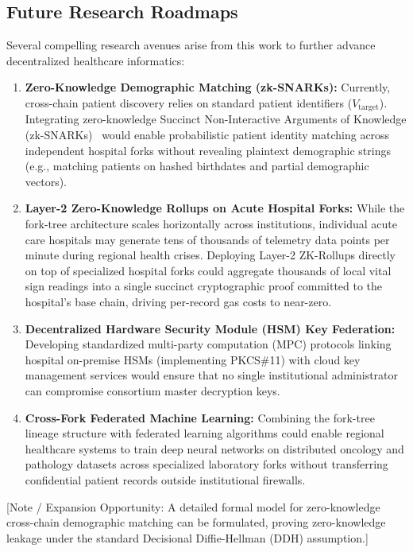 \subsection{Future Research Roadmaps}
Several compelling research avenues arise from this work to further advance decentralized healthcare informatics:
\begin{enumerate}
    \item \textbf{Zero-Knowledge Demographic Matching (zk-SNARKs):} Currently, cross-chain patient discovery relies on standard patient identifiers ($V_{\text{target}}$). Integrating zero-knowledge Succinct Non-Interactive Arguments of Knowledge (zk-SNARKs)~\cite{sasson2014zerocash} would enable probabilistic patient identity matching across independent hospital forks without revealing plaintext demographic strings (e.g., matching patients on hashed birthdates and partial demographic vectors).
    \item \textbf{Layer-2 Zero-Knowledge Rollups on Acute Hospital Forks:} While the fork-tree architecture scales horizontally across institutions, individual acute care hospitals may generate tens of thousands of telemetry data points per minute during regional health crises. Deploying Layer-2 ZK-Rollups directly on top of specialized hospital forks could aggregate thousands of local vital sign readings into a single succinct cryptographic proof committed to the hospital's base chain, driving per-record gas costs to near-zero.
    \item \textbf{Decentralized Hardware Security Module (HSM) Key Federation:} Developing standardized multi-party computation (MPC) protocols linking hospital on-premise HSMs (implementing PKCS\#11) with cloud key management services would ensure that no single institutional administrator can compromise consortium master decryption keys.
    \item \textbf{Cross-Fork Federated Machine Learning:} Combining the fork-tree lineage structure with federated learning algorithms could enable regional healthcare systems to train deep neural networks on distributed oncology and pathology datasets across specialized laboratory forks without transferring confidential patient records outside institutional firewalls.
\end{enumerate}

[Note / Expansion Opportunity: A detailed formal model for zero-knowledge cross-chain demographic matching can be formulated, proving zero-knowledge leakage under the standard Decisional Diffie-Hellman (DDH) assumption.]
